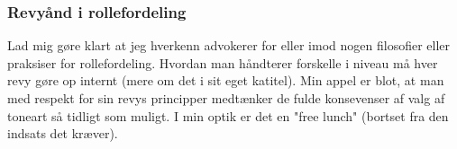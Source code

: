 \subsubsection{Revyånd i rollefordeling}
Lad mig gøre klart at jeg hverkenn advokerer for eller imod nogen filosofier eller praksiser for rollefordeling.
Hvordan man håndterer forskelle i niveau må hver revy gøre op internt (mere om det i sit eget katitel).
Min appel er blot, at man med respekt for sin revys principper medtænker de fulde konsevenser af valg af toneart så tidligt som muligt.
I min optik er det en "free lunch" (bortset fra den indsats det kræver).